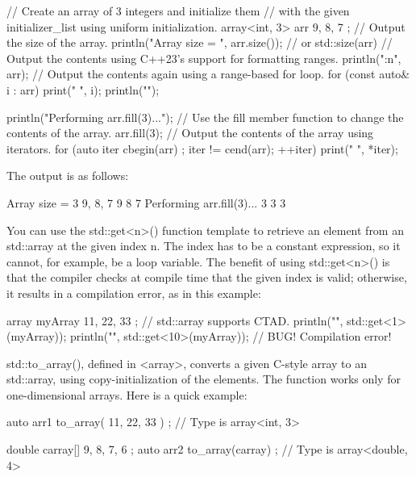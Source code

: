 \begin{cpp}
// Create an array of 3 integers and initialize them
// with the given initializer_list using uniform initialization.
array<int, 3> arr { 9, 8, 7 };
// Output the size of the array.
println("Array size = {}", arr.size()); // or std::size(arr)
// Output the contents using C++23's support for formatting ranges.
println("{:n}", arr);
// Output the contents again using a range-based for loop.
for (const auto& i : arr) { print("{} ", i); }
println("");

println("Performing arr.fill(3)...");
// Use the fill member function to change the contents of the array.
arr.fill(3);
// Output the contents of the array using iterators.
for (auto iter { cbegin(arr) }; iter != cend(arr); ++iter) {
    print("{} ", *iter);
}
\end{cpp}

The output is as follows:

\begin{shell}
Array size = 3
9, 8, 7
9 8 7
Performing arr.fill(3)...
3 3 3
\end{shell}

You can use the std::get<n>() function template to retrieve an element from an std::array at the given index n. The index has to be a constant expression, so it cannot, for example, be a loop variable. The benefit of using std::get<n>() is that the compiler checks at compile time that the given index is valid; otherwise, it results in a compilation error, as in this example:

\begin{cpp}
array myArray { 11, 22, 33 }; // std::array supports CTAD.
println("{}", std::get<1>(myArray));
println("{}", std::get<10>(myArray)); // BUG! Compilation error!
\end{cpp}

std::to\_array(), defined in <array>, converts a given C-style array to an std::array, using copy-initialization of the elements. The function works only for one-dimensional arrays. Here is a quick example:

\begin{cpp}
auto arr1 { to_array({ 11, 22, 33 }) }; // Type is array<int, 3>

double carray[] { 9, 8, 7, 6 };
auto arr2 { to_array(carray) }; // Type is array<double, 4>
\end{cpp}









